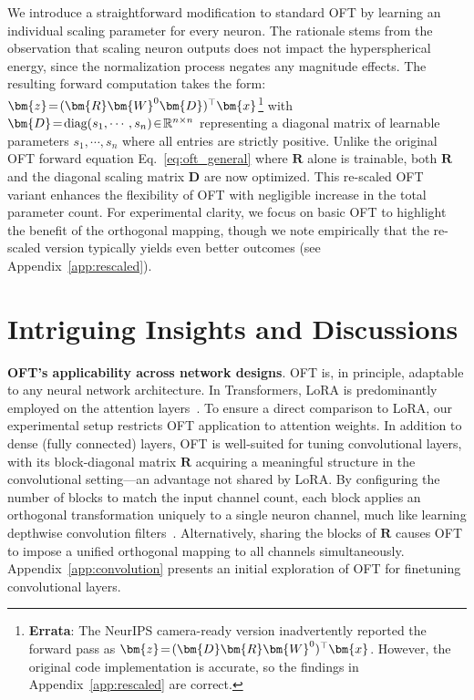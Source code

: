 We introduce a straightforward modification to standard OFT by learning an individual scaling parameter for every neuron. The rationale stems from the observation that scaling neuron outputs does not impact the hyperspherical energy, since the normalization process negates any magnitude effects. The resulting forward computation takes the form: $\thickmuskip=2mu \medmuskip=2mu\bm{z}=(\bm{R}\bm{W}^0\bm{D})^\top\bm{x}$\footnote{\textbf{Errata}: The NeurIPS camera-ready version inadvertently reported the forward pass as $\thickmuskip=2mu \medmuskip=2mu\bm{z}=(\bm{D}\bm{R}\bm{W}^0)^\top\bm{x}$. However, the original code implementation is accurate, so the findings in Appendix~\ref{app:rescaled} are correct.} with $\thickmuskip=2mu \medmuskip=2mu \bm{D}=\text{diag}(s_1,\cdots,s_n)\in\mathbb{R}^{n\times n}$ representing a diagonal matrix of learnable parameters $s_1,\cdots,s_n$ where all entries are strictly positive. Unlike the original OFT forward equation Eq.~\eqref{eq:oft_general} where $\bm{R}$ alone is trainable, both $\bm{R}$ and the diagonal scaling matrix $\bm{D}$ are now optimized. This re-scaled OFT variant enhances the flexibility of OFT with negligible increase in the total parameter count. For experimental clarity, we focus on basic OFT to highlight the benefit of the orthogonal mapping, though we note empirically that the re-scaled version typically yields even better outcomes (see Appendix~\ref{app:rescaled}).

\section{Intriguing Insights and Discussions}

\textbf{OFT’s applicability across network designs}. OFT is, in principle, adaptable to any neural network architecture. In Transformers, LoRA is predominantly employed on the attention layers~\cite{hulora2022}. To ensure a direct comparison to LoRA, our experimental setup restricts OFT application to attention weights. In addition to dense (fully connected) layers, OFT is well-suited for tuning convolutional layers, with its block-diagonal matrix $\bm{R}$ acquiring a meaningful structure in the convolutional setting—an advantage not shared by LoRA. By configuring the number of blocks to match the input channel count, each block applies an orthogonal transformation uniquely to a single neuron channel, much like learning depthwise convolution filters~\cite{chollet2017xception}. Alternatively, sharing the blocks of $\bm{R}$ causes OFT to impose a unified orthogonal mapping to all channels simultaneously. Appendix~\ref{app:convolution} presents an initial exploration of OFT for finetuning convolutional layers.

